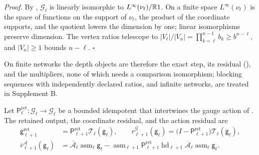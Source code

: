 \noindent\emph{Proof.}
By , $\mathcal G_\ell$ is linearly
isomorphic to $L^\infty(\nu_\ell)/\mathbb R1$. On a finite space $L^\infty(\nu_\ell)$ is the
space of functions on the support of $\nu_\ell$, the product of the coordinate
supports, and the quotient lowers the dimension by one; linear isomorphisms
preserve dimension. The vertex ratios telescope to
$\lvert V_\ell\rvert/\lvert V_n\rvert=\prod_{k=\ell}^{n-1}b_k\ge b^{n-\ell}$, and
$\lvert V_n\rvert\ge1$ bounds $n-\ell$. $\square$

On finite networks the depth objects are therefore the exact step, its residual
(), and the multipliers, none of which needs a
comparison isomorphism; blocking sequences with independently declared ratios, and
infinite networks, are treated in Supplement B.

Let $\mathsf P^{\mathrm{ret}}_\ell:\mathcal G_\ell\to\mathcal G_\ell$ be a bounded
idempotent that intertwines the gauge action of
. The retained output, the coordinate
residual, and the action residual are
\begin{align}
\mathsf g^{\mathrm{ret}}_{\ell+1}&=\mathsf P^{\mathrm{ret}}_{\ell+1}\mathcal T_\ell(\mathsf g_\ell),
\qquad
r^{\mathcal G}_{\ell+1}(\mathsf g_\ell)
=\bigl(I-\mathsf P^{\mathrm{ret}}_{\ell+1}\bigr)\mathcal T_\ell(\mathsf g_\ell),
\label{eq:rg-interaction-coordinate-residual}\\
\overline r^{\mathcal A}_{\ell+1}(\mathsf g_\ell)
&=\overline{\mathcal A}_\ell\operatorname{asm}_\ell\mathsf g_\ell
-\operatorname{asm}_{\ell+1}\mathsf P^{\mathrm{ret}}_{\ell+1}\operatorname{hd}_{\ell+1}
\overline{\mathcal A}_\ell\operatorname{asm}_\ell\mathsf g_\ell .
\label{eq:rg-interaction-action-residual}
\end{align}

